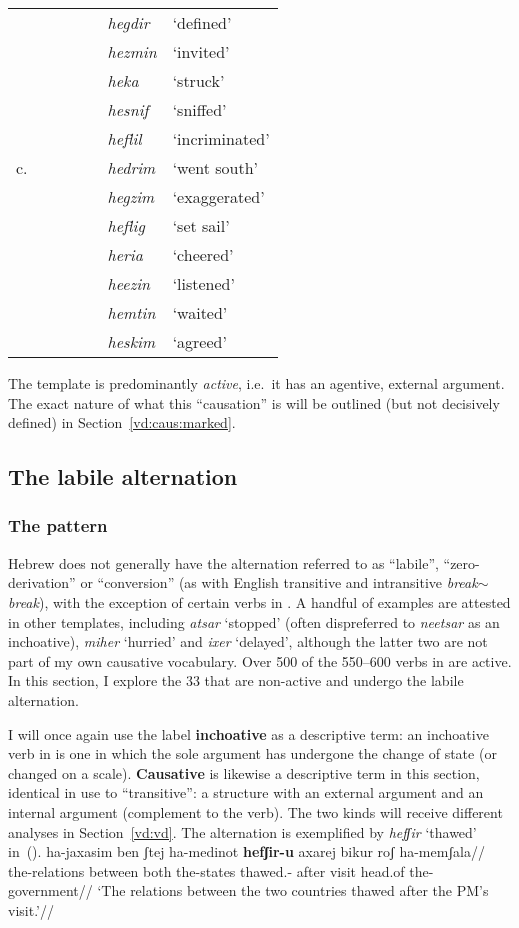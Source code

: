 \begin{tabular}{l|ll|ll|ll}
	& &&&& \emph{hegdir} & `defined'\\
	& &&&& \emph{hezmin} & `invited'\\
	& &&&& \emph{heka} & `struck'\\
	& &&&& \emph{hesnif} & `sniffed'\\
	& &&&& \emph{heflil} & `incriminated'\\
	\hline
	c.	& &&&&  \emph{hedrim} & `went south' \\
		& &&&&  \emph{hegzim} & `exaggerated' \\
		& &&&&  \emph{heflig} & `set sail' \\
		& &&&&  \emph{heria} & `cheered' \\
		& &&&& \emph{heezin} & `listened'\\
		& &&&& \emph{hemtin} & `waited'\\
		& &&&& \emph{heskim} & `agreed'\\
	\end{tabular}
\xe

The template is predominantly \emph{active}, i.e.~it has an agentive, external argument. The exact nature of what this ``causation'' is will be outlined (but not decisively defined) in Section~\ref{vd:caus:marked}.


	\subsection{The labile alternation} \label{vd:thif:inch}
		\subsubsection{The pattern}
Hebrew does not generally have the alternation referred to as ``labile'', ``zero-derivation'' or ``conversion'' (as with English transitive and intransitive \emph{break}$\sim$\emph{break}), with the exception of certain verbs in {\thif}. A handful of examples are attested in other templates, including \emph{a{ts}ar} `stopped' (often dispreferred to \emph{nee{ts}ar} as an inchoative), \emph{miher} `hurried' and \emph{ixer} `delayed', although the latter two are not part of my own causative vocabulary. Over 500 of the 550--600 verbs in {\thif} are active. In this section, I explore the 33 that are non-active and undergo the labile alternation.

I will once again use the label \textbf{inchoative} as a descriptive term: an inchoative verb in {\thif} is one in which the sole argument has undergone the change of state (or changed on a scale). \textbf{Causative} is likewise a descriptive term in this section, identical in use to ``transitive'': a structure with an external argument and an internal argument (complement to the verb). The two kinds will receive different analyses in Section~\ref{vd:vd}. The alternation is exemplified by \emph{hefʃir} `thawed' in~(\nextx).
\pex\label{ex:vd:thif-hefSir}
	\a \begingl
		\gla ha-jaxasim ben ʃtej ha-medinot \textbf{hefʃir-u} axarej bikur roʃ ha-memʃala//
		\glb the-relations between both the-states thawed.- after visit head.of the-government//
		\glft `The relations between the two countries thawed after the PM's visit.'//
		\endgl
	
